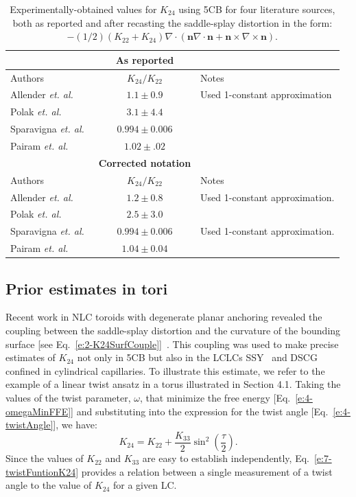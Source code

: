 \begin{table}[t]
  \centering
  \caption{Experimentally-obtained values for $K_{24}$ using 5CB for four literature sources, both as reported and after recasting the saddle-splay distortion in the form: $-(1/2)(K_{22} + K_{24})\nabla \cdot (\mathbf{n}\nabla \cdot \mathbf{n} + \mathbf{n} \times \nabla \times \mathbf{n})$.}
  \begin{tabular}{l c l}
    & {\bf As reported} & \\
    \hline
    Authors & $K_{24}/K_{22}$ & Notes \\
    \hline
    Allender \emph{et. al.}~\cite{allender1991determination} & $1.1 \pm 0.9$ & Used 1-constant approximation\\
    Polak \emph{et. al.}~\cite{polak1994optical} & $3.1 \pm 4.4$ \\
    Sparavigna \emph{et. al.}~\cite{sparavigna1994periodic} & $0.994 \pm 0.006$ \\
    Pairam \emph{et. al.}~\cite{RN24} & $1.02 \pm .02$ \\
    & {\bf Corrected notation} & \\
    \hline
    Authors & $K_{24}/K_{22}$ & Notes \\
    \hline
    Allender \emph{et. al.}~\cite{allender1991determination} & $1.2 \pm 0.8$ & Used 1-constant approximation. \\
    Polak \emph{et. al.}~\cite{polak1994optical} & $2.5 \pm 3.0$ \\
    Sparavigna \emph{et. al.}~\cite{sparavigna1994periodic} & $0.994 \pm 0.006$ & Used 1-constant approximation.\\
    Pairam \emph{et. al.}~\cite{RN24} & $1.04 \pm 0.04$ \\
  \end{tabular}
  \label{t:7-K24}

\end{table}
\subsection{Prior estimates in tori}
Recent work in NLC toroids with degenerate planar anchoring revealed the coupling between the saddle-splay distortion and the curvature of the bounding surface [see Eq.~\ref{e:2-K24SurfCouple}]~\cite{RN24,RN59}.
This coupling was used to make precise estimates of $K_{24}$ not only in 5CB but also in the LCLCs SSY~\cite{RN191,RN293} and DSCG~\cite{RN293} confined in cylindrical capillaries.
To illustrate this estimate, we refer to the example of a linear twist ansatz in a torus illustrated in Section 4.1.
Taking the values of the twist parameter, $\omega$, that minimize the free energy [Eq.~\ref{e:4-omegaMinFFE}] and substituting into the expression for the twist angle [Eq.~\ref{e:4-twistAngle}], we have:
\begin{equation}
  K_{24} = K_{22} + \frac{K_{33}}{2}\sin ^2 \left( \frac{\tau}{2} \right ).\label{e:7-twistFuntionK24}
\end{equation}
Since the values of $K_{22}$ and $K_{33}$ are easy to establish independently, Eq.~\ref{e:7-twistFuntionK24} provides a relation between a single measurement of a twist angle to the value of $K_{24}$ for a given LC.

